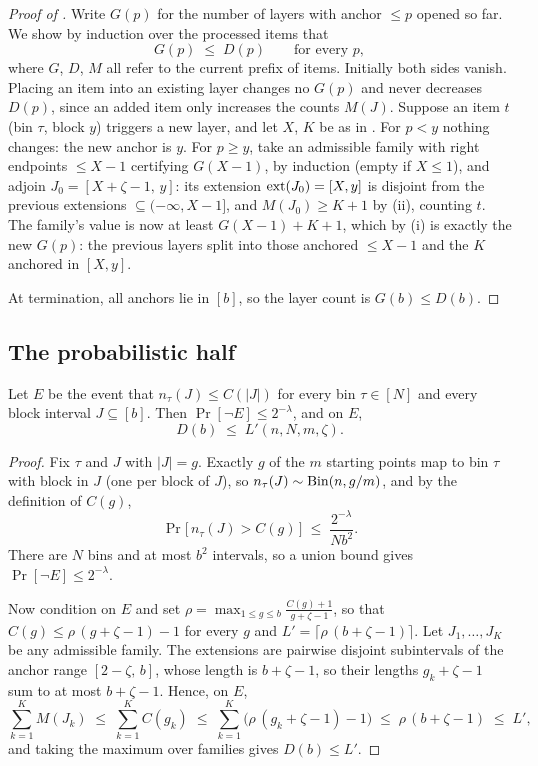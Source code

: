\begin{proof}[Proof of ]
Write $G(p)$ for the number of layers with anchor $\le p$ opened so far. We
show by induction over the processed items that
\begin{equation}
  \label{eq:invariant}
  G(p) \;\le\; D(p) \qquad \text{for every } p,
\end{equation}
where $G$, $D$, $M$ all refer to the current prefix of items. Initially both
sides vanish. Placing an item into an existing layer changes no $G(p)$ and
never decreases $D(p)$, since an added item only increases the counts
$M(J)$. Suppose an item $t$ (bin $\tau$, block $y$) triggers a new layer,
and let $X$, $K$ be as in . For $p < y$ nothing
changes: the new anchor is $y$. For $p \ge y$, take an admissible family
with right endpoints $\le X - 1$ certifying $G(X-1)$, by induction (empty if
$X \le 1$), and adjoin $J_0 = [X + \zeta - 1,\, y]$: its extension
$\mathrm{ext}(J_0) = [X, y]$ is disjoint from the previous extensions
$\subseteq (-\infty, X-1]$, and $M(J_0) \ge K + 1$ by
(ii), counting $t$. The family's value is now at least
$G(X-1) + K + 1$, which by (i) is exactly the new
$G(p)$: the previous layers split into those anchored $\le X - 1$ and the
$K$ anchored in $[X, y]$.

At termination, all anchors lie in $[b]$, so the layer count is
$G(b) \le D(b)$.
\end{proof}

\subsection{The probabilistic half}

\begin{proposition}
\label{prop:prob}
Let $E$ be the event that $n_\tau(J) \le C(|J|)$ for every bin
$\tau \in [N]$ and every block interval $J \subseteq [b]$. Then
$\Pr[\lnot E] \le 2^{-\lambda}$, and on $E$,
\[
  D(b) \;\le\; L'(n, N, m, \zeta).
\]
\end{proposition}

\begin{proof}
Fix $\tau$ and $J$ with $|J| = g$. Exactly $g$ of the $m$ starting points
map to bin $\tau$ with block in $J$ (one per block of $J$), so
$n_\tau(J) \sim \mathrm{Bin}(n, g/m)$, and by the definition of $C(g)$,
\[
  \Pr\big[\, n_\tau(J) > C(g) \,\big] \;\le\; \frac{2^{-\lambda}}{N b^2}.
\]
There are $N$ bins and at most $b^2$ intervals, so a union bound gives
$\Pr[\lnot E] \le 2^{-\lambda}$.

Now condition on $E$ and set
$\rho = \max_{1 \le g \le b} \frac{C(g)+1}{g+\zeta-1}$, so that
$C(g) \le \rho\,(g+\zeta-1) - 1$ for every $g$ and
$L' = \lceil \rho\,(b+\zeta-1) \rceil$. Let $J_1, \dots, J_K$ be any
admissible family. The extensions are pairwise disjoint subintervals of the
anchor range $[2-\zeta,\, b]$, whose length is $b+\zeta-1$, so their
lengths $g_k + \zeta - 1$ sum to at most $b+\zeta-1$. Hence, on $E$,
\[
  \sum_{k=1}^{K} M(J_k)
  \;\le\; \sum_{k=1}^{K} C(g_k)
  \;\le\; \sum_{k=1}^{K} \big( \rho\,(g_k+\zeta-1) - 1 \big)
  \;\le\; \rho\,(b+\zeta-1)
  \;\le\; L',
\]
and taking the maximum over families gives $D(b) \le L'$.
\end{proof}

